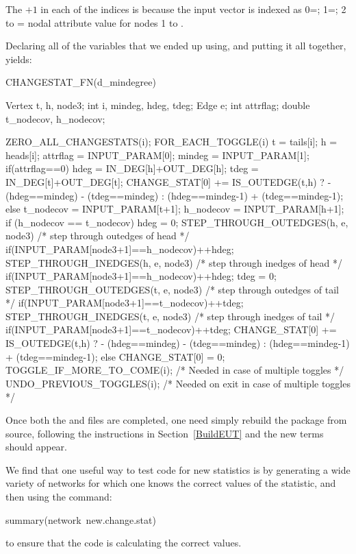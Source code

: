 \documentclass[nojss]{jss}
\begin{document}
The $+1$ in each of the  indices is because the input vector is indexed as 0=; 1=; 2 to  = nodal attribute value for nodes 1 to .

Declaring all of the variables that we ended up using, and putting it all together, yields:
\begin{CodeChunk}
\begin{CodeInput}
CHANGESTAT_FN(d_mindegree) {
  Vertex t, h, node3;
  int i, mindeg, hdeg, tdeg;
  Edge e;
  int attrflag;
  double t_nodecov, h_nodecov;

  ZERO_ALL_CHANGESTATS(i);
  FOR_EACH_TOGGLE(i) {
    t = tails[i]; h = heads[i];
    attrflag = INPUT_PARAM[0];
    mindeg = INPUT_PARAM[1];
    if(attrflag==0){
      hdeg = IN_DEG[h]+OUT_DEG[h];
      tdeg = IN_DEG[t]+OUT_DEG[t];
      CHANGE_STAT[0] += IS_OUTEDGE(t,h) ?
        - (hdeg==mindeg) - (tdeg==mindeg) :
        (hdeg==mindeg-1) + (tdeg==mindeg-1);
    }else{
      t_nodecov = INPUT_PARAM[t+1];
      h_nodecov = INPUT_PARAM[h+1];
      if (h_nodecov == t_nodecov) {
        hdeg = 0;
        STEP_THROUGH_OUTEDGES(h, e, node3) { /* step through outedges of head */
          if(INPUT_PARAM[node3+1]==h_nodecov){++hdeg;}
        }
        STEP_THROUGH_INEDGES(h, e, node3) { /* step through inedges of head */
          if(INPUT_PARAM[node3+1]==h_nodecov){++hdeg;}
        }
        tdeg = 0;
        STEP_THROUGH_OUTEDGES(t, e, node3) { /* step through outedges of tail */
          if(INPUT_PARAM[node3+1]==t_nodecov){++tdeg;}
        }
        STEP_THROUGH_INEDGES(t, e, node3) { /* step through inedges of tail */
          if(INPUT_PARAM[node3+1]==t_nodecov){++tdeg;}
        }
        CHANGE_STAT[0] += IS_OUTEDGE(t,h) ?
          - (hdeg==mindeg) - (tdeg==mindeg) :
          (hdeg==mindeg-1) + (tdeg==mindeg-1);
      }else{
        CHANGE_STAT[0] = 0;
      }
    }
    TOGGLE_IF_MORE_TO_COME(i); /* Needed in case of multiple toggles */
  }
  UNDO_PREVIOUS_TOGGLES(i); /* Needed on exit in case of multiple toggles */
}
\end{CodeInput}
\end{CodeChunk}

Once both the  and  files are completed, one need simply rebuild the package from source, following the instructions in Section~\ref{BuildEUT} and the new terms should appear.

We find that one useful way to test code for new statistics is by generating a wide variety of networks for which one knows the correct values of the statistic, and then using the command:
\begin{CodeChunk}
\begin{CodeInput}
summary(network~new.change.stat)
\end{CodeInput}
\end{CodeChunk}
to ensure that the code is calculating the correct values.
\end{document}
